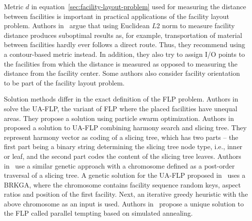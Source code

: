 Metric $d$ in equation~\ref{sec:facility-layout-problem} used for measuring the distance between facilities is important in practical applications of the facility layout problem.
Authors in~\cite{friedrichIntegratedSlicingTree2018} argue that using Euclidean $L2$ norm
to measure facility distance produces suboptimal results as, for example, transportation of material between facilities
hardly ever follows a direct route.
Thus, they recommend using a contour-based metric instead.
In addition, they also try to assign I/O points to the facilities from which the distance is measured as opposed to measuring the distance from the facility center.
Some authors also consider facility orientation~\cite{liuMultiobjectiveParticleSwarm2018, tamHierarchicalApproachFacility1991}
to be part of the facility layout problem.

Solution methods differ in the exact definition of the FLP problem.
Authors in~\cite{liuMultiobjectiveParticleSwarm2018} solve the UA-FLP, the variant of FLP where the placed facilities have unequal areas.
They propose a solution using particle swarm optimization.
Authors in~\cite{changSlicingTreeRepresentation2013} proposed a solution to UA-FLP combining harmony search and slicing tree.
They represent harmony vector as coding of a slicing tree, which has two parts – the first part being a binary string determining the slicing tree node type, i.e., inner or leaf, and the second part codes the content of the slicing tree leaves.
Authors in~\cite{karyantamGeneticAlgorithmsFunction1992} use a similar genetic approach with a chromosome defined as a post-order traversal of a slicing tree.
A genetic solution for the UA-FLP proposed in~\cite{goncalvesBiasedRandomkeyGenetic2015} uses a BRKGA, where the chromosome contains facility sequence random keys,
aspect ratios and position of the first facility.
Next, an iterative greedy heuristic with the above chromosome as an input is used.
Authors in~\cite{friedrichIntegratedSlicingTree2018} propose a unique solution to the FLP called parallel tempting based on simulated annealing.
